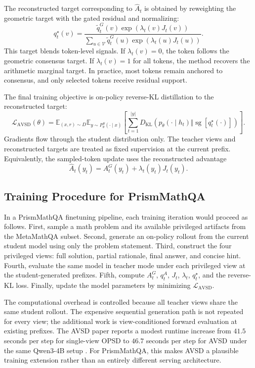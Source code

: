 The reconstructed target corresponding to $\widehat{A}_t$ is obtained by reweighting the geometric target with the gated residual and normalizing:
\[
    q_t^{\star}(v)
    =
    \frac{\widetilde{q}_t^G(v)\exp(\lambda_t(v)J_t(v))}
    {\sum_{u\in\mathcal{V}}\widetilde{q}_t^G(u)\exp(\lambda_t(u)J_t(u))}.
\]
This target blends token-level signals. If $\lambda_t(v)=0$, the token follows the geometric consensus target. If $\lambda_t(v)=1$ for all tokens, the method recovers the arithmetic marginal target. In practice, most tokens remain anchored to consensus, and only selected tokens receive residual support.

The final training objective is on-policy reverse-KL distillation to the reconstructed target:
\[
    \mathcal{L}_{\mathrm{AVSD}}(\theta)
    =
    \mathbb{E}_{(x,r)\sim D}
    \mathbb{E}_{y\sim P_{\theta}^{S}(\cdot\mid x)}
    \left[
    \sum_{t=1}^{|y|}
    D_{\mathrm{KL}}\left(
    p_{\theta}(\cdot\mid h_t)
    \Vert
    \operatorname{sg}[q_t^{\star}(\cdot)]
    \right)
    \right].
    \label{eq:avsd-loss}
\]
Gradients flow through the student distribution only. The teacher views and reconstructed targets are treated as fixed supervision at the current prefix. Equivalently, the sampled-token update uses the reconstructed advantage
\[
    \widehat{A}_t(y_t)=A_t^G(y_t)+\lambda_t(y_t)J_t(y_t).
\]

\subsection{Training Procedure for PrismMathQA}

In a PrismMathQA finetuning pipeline, each training iteration would proceed as follows. First, sample a math problem and its available privileged artifacts from the MetaMathQA subset. Second, generate an on-policy rollout from the current student model using only the problem statement. Third, construct the four privileged views: full solution, partial rationale, final answer, and concise hint. Fourth, evaluate the same model in teacher mode under each privileged view at the student-generated prefixes. Fifth, compute $A_t^G$, $q_t^A$, $J_t$, $\lambda_t$, $q_t^{\star}$, and the reverse-KL loss. Finally, update the model parameters by minimizing $\mathcal{L}_{\mathrm{AVSD}}$.

The computational overhead is controlled because all teacher views share the same student rollout. The expensive sequential generation path is not repeated for every view; the additional work is view-conditioned forward evaluation at existing prefixes. The AVSD paper reports a modest runtime increase from $41.5$ seconds per step for single-view OPSD to $46.7$ seconds per step for AVSD under the same Qwen3-4B setup \citep{nguyen2026avsd}. For PrismMathQA, this makes AVSD a plausible training extension rather than an entirely different serving architecture.

